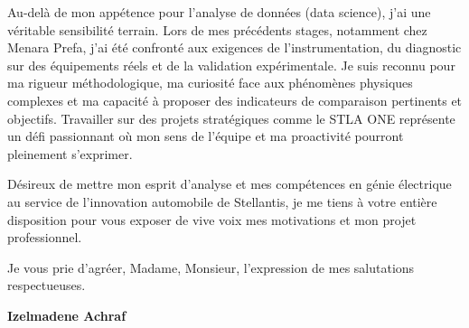 \documentclass[10pt,a4paper]{altacv}
\begin{document}
\vspace{0.4cm}

Au-delà de mon appétence pour l'analyse de données (data science), j'ai une véritable sensibilité terrain. Lors de mes précédents stages, notamment chez Menara Prefa, j'ai été confronté aux exigences de l'instrumentation, du diagnostic sur des équipements réels et de la validation expérimentale. Je suis reconnu pour ma rigueur méthodologique, ma curiosité face aux phénomènes physiques complexes et ma capacité à proposer des indicateurs de comparaison pertinents et objectifs. Travailler sur des projets stratégiques comme le STLA ONE représente un défi passionnant où mon sens de l'équipe et ma proactivité pourront pleinement s'exprimer.

\vspace{0.4cm}

Désireux de mettre mon esprit d'analyse et mes compétences en génie électrique au service de l'innovation automobile de Stellantis, je me tiens à votre entière disposition pour vous exposer de vive voix mes motivations et mon projet professionnel. 

\vspace{0.4cm}

Je vous prie d'agréer, Madame, Monsieur, l'expression de mes salutations respectueuses.

\vspace{0.5cm}

\vfill

\begin{flushright}
  \Large\color{emphasis}\textbf{Izelmadene Achraf}
\end{flushright}
\end{document}

